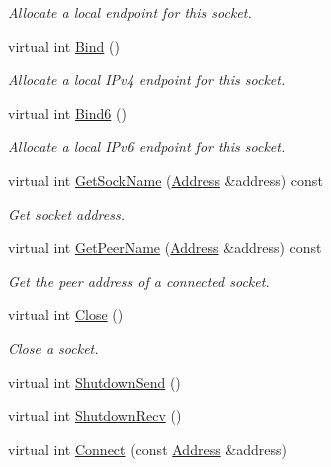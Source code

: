 \begin{DoxyCompactItemize}
\begin{DoxyCompactList}\small\item\em Allocate a local endpoint for this socket. \end{DoxyCompactList}\item 
virtual int \hyperlink{classns3_1_1Ipv6RawSocketImpl_a603c1513edeb41a86ab7728c955e44f4}{Bind} ()
\begin{DoxyCompactList}\small\item\em Allocate a local I\+Pv4 endpoint for this socket. \end{DoxyCompactList}\item 
virtual int \hyperlink{classns3_1_1Ipv6RawSocketImpl_abcf2203adb441fb47bdff155bec17d19}{Bind6} ()
\begin{DoxyCompactList}\small\item\em Allocate a local I\+Pv6 endpoint for this socket. \end{DoxyCompactList}\item 
virtual int \hyperlink{classns3_1_1Ipv6RawSocketImpl_abeb2cea9c843ffd9dbe2697986384758}{Get\+Sock\+Name} (\hyperlink{classns3_1_1Address}{Address} \&address) const 
\begin{DoxyCompactList}\small\item\em Get socket address. \end{DoxyCompactList}\item 
virtual int \hyperlink{classns3_1_1Ipv6RawSocketImpl_ac04cccb682dbc921f8478b152fa115bd}{Get\+Peer\+Name} (\hyperlink{classns3_1_1Address}{Address} \&address) const 
\begin{DoxyCompactList}\small\item\em Get the peer address of a connected socket. \end{DoxyCompactList}\item 
virtual int \hyperlink{classns3_1_1Ipv6RawSocketImpl_a2abab77b9bf0cc99272ce5549690f8cb}{Close} ()
\begin{DoxyCompactList}\small\item\em Close a socket. \end{DoxyCompactList}\item 
virtual int \hyperlink{classns3_1_1Ipv6RawSocketImpl_ae485f899ce976e799770adb46a5fdd91}{Shutdown\+Send} ()
\item 
virtual int \hyperlink{classns3_1_1Ipv6RawSocketImpl_a7ce536d970b3546fe5bce17dbe9ab38d}{Shutdown\+Recv} ()
\item 
virtual int \hyperlink{classns3_1_1Ipv6RawSocketImpl_a497cee47b0eb1a7a585f88fbcf152aa9}{Connect} (const \hyperlink{classns3_1_1Address}{Address} \&address)

\end{DoxyCompactItemize}
